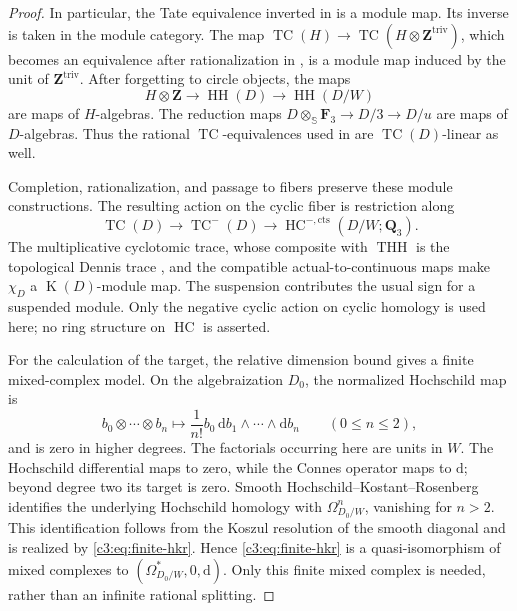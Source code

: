 \documentclass[11pt,a4paper]{amsart}
\numberwithin{equation}{section}
\theoremstyle{definition}
\theoremstyle{remark}
\newcommand{\CthreeZ}{\mathbf{Z}}
\newcommand{\CthreeQ}{\mathbf{Q}}
\newcommand{\CthreeF}{\mathbf{F}}
\newcommand{\CthreebS}{\mathbb{S}}
\newcommand{\Cthreedd}{\mathrm{d}}
\newcommand{\Cthreects}{\mathrm{cts}}
\newcommand{\Cthreetriv}{\mathrm{triv}}
\DeclareMathOperator{\CthreeK}{K}
\DeclareMathOperator{\CthreeHH}{HH}
\DeclareMathOperator{\CthreeHC}{HC}
\DeclareMathOperator{\CthreeTHH}{THH}
\DeclareMathOperator{\CthreeTC}{TC}
\begin{document}
\begin{proof}
In particular, the Tate equivalence inverted in
\cite[Corollary~2.10]{AMMN} is a module map.
Its inverse is taken in the module category.
The map
$\CthreeTC(H)\to\CthreeTC(H\otimes\CthreeZ^{\Cthreetriv})$, which becomes an equivalence after
rationalization in \cite[Theorem~2.12]{AMMN}, is a module map induced
by the unit of $\CthreeZ^{\Cthreetriv}$.
After forgetting to circle objects, the maps
\[
 H\otimes\CthreeZ\longrightarrow\CthreeHH(D)
       \longrightarrow\CthreeHH(D/W)
\]
are maps of $H$-algebras.
The reduction maps
$D\otimes_{\CthreebS}\CthreeF_3\to D/3\to D/u$ are maps of $D$-algebras.
Thus the rational $\CthreeTC$-equivalences used in
\cite[Definition~2.14 and Proposition~4.10]{AMMN} are
$\CthreeTC(D)$-linear as well.

Completion, rationalization, and passage to fibers preserve these
module constructions. The resulting action on the cyclic fiber is
restriction along
\[
 \CthreeTC(D)\longrightarrow\CthreeTC^-(D)
       \longrightarrow\CthreeHC^{-,\Cthreects}(D/W;\CthreeQ_3).
\]
The multiplicative cyclotomic trace, whose composite with $\CthreeTHH$ is
the topological Dennis trace
\cite[Theorems~7.3 and~7.4]{BGTTrace}, and the compatible
actual-to-continuous maps make $\chi_D$ a $\CthreeK(D)$-module map.
The suspension contributes the usual sign for a suspended module.
Only the negative cyclic action on cyclic homology is used here;
no ring structure on $\CthreeHC$ is asserted.

For the calculation of the target, the relative dimension bound gives
a finite mixed-complex model. On the algebraization $D_0$, the
normalized Hochschild map is
\begin{equation}\label{c3:eq:finite-hkr}
 b_0\otimes\cdots\otimes b_n
   \longmapsto
   \frac{1}{n!}b_0\,\Cthreedd b_1\wedge\cdots\wedge\Cthreedd b_n
   \qquad(0\leq n\leq2),
\end{equation}
and is zero in higher degrees.
The factorials occurring here are units in $W$.
The Hochschild differential maps to zero, while the Connes operator
maps to $\Cthreedd$; beyond degree two its target is zero.
Smooth Hochschild--Kostant--Rosenberg identifies the underlying
Hochschild homology with $\Omega^n_{D_0/W}$, vanishing for $n>2$.
This identification follows from the Koszul resolution of the smooth
diagonal and is realized by \eqref{c3:eq:finite-hkr}.
Hence \eqref{c3:eq:finite-hkr} is a quasi-isomorphism of mixed complexes
to $(\Omega^\ast_{D_0/W},0,\Cthreedd)$.
Only this finite mixed complex is needed, rather than an infinite
rational splitting.


\end{proof}
\end{document}

